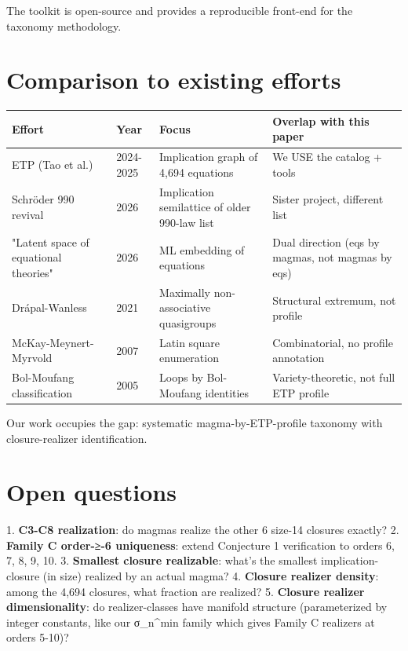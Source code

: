 \documentclass[11pt,reqno]{amsart}
\theoremstyle{plain}
\theoremstyle{definition}
\begin{document}
The toolkit is open-source and provides a reproducible front-end for the taxonomy methodology.

\section{Comparison to existing efforts}

\begin{center}
\begin{tabular}{llll}
\toprule
Effort & Year & Focus & Overlap with this paper \\
\midrule
ETP (Tao et al.) & 2024-2025 & Implication graph of 4,694 equations & We USE the catalog + tools \\
Schröder 990 revival & 2026 & Implication semilattice of older 990-law list & Sister project, different list \\
"Latent space of equational theories" & 2026 & ML embedding of equations & Dual direction (eqs by magmas, not magmas by eqs) \\
Drápal-Wanless & 2021 & Maximally non-associative quasigroups & Structural extremum, not profile \\
McKay-Meynert-Myrvold & 2007 & Latin square enumeration & Combinatorial, no profile annotation \\
Bol-Moufang classification & 2005 & Loops by Bol-Moufang identities & Variety-theoretic, not full ETP profile \\
\bottomrule
\end{tabular}
\end{center}

Our work occupies the gap: systematic magma-by-ETP-profile taxonomy with closure-realizer identification.

\section{Open questions}

1. \textbf{C3-C8 realization}: do magmas realize the other 6 size-14 closures exactly?
2. \textbf{Family C order-≥-6 uniqueness}: extend Conjecture 1 verification to orders 6, 7, 8, 9, 10.
3. \textbf{Smallest closure realizable}: what's the smallest implication-closure (in size) realized by an actual magma?
4. \textbf{Closure realizer density}: among the 4,694 closures, what fraction are realized?
5. \textbf{Closure realizer dimensionality}: do realizer-classes have manifold structure (parameterized by integer constants, like our σ_n^min family which gives Family C realizers at orders 5-10)?
\end{document}

